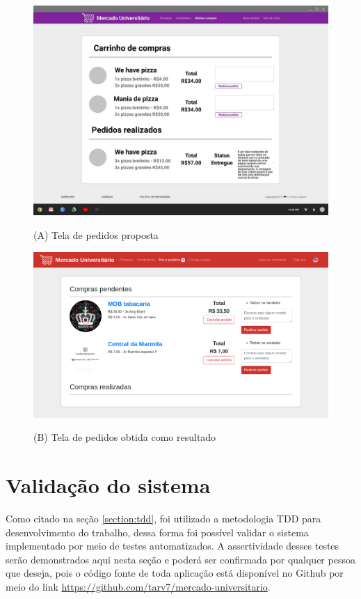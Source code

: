 \begin{figure}[htbp!]
  \centering
  \caption{(A) Tela de pedidos proposta}
  \includegraphics[width=1\textwidth]{figs/mockup/carrinho.jpg}
    \label{fig:mockup_pedidos}
\end{figure}

\begin{figure}[htbp!]
  \centering
  \caption{(B) Tela de pedidos obtida como resultado}
  \includegraphics[width=1\textwidth]{figs/resultado/carrinho.png}
    \label{fig:real_pedidos}
\end{figure}

\section{Validação do sistema}

Como citado na seção \ref{section:tdd}, foi utilizado a metodologia TDD para desenvolvimento do trabalho, dessa forma foi possível validar o sistema implementado por meio de testes automatizados. A assertividade desses testes serão demonstrados aqui nesta seção e poderá ser confirmada por qualquer pessoa que deseja, pois o código fonte de toda aplicação está disponível no Github por meio do link \url{https://github.com/tarv7/mercado-universitario}.

